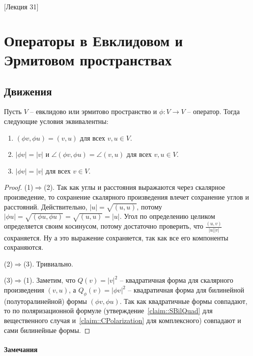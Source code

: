 [Лекция 31]


\newpage
\section{Операторы в Евклидовом и Эрмитовом пространствах}

\subsection{Движения}

\begin{claim}
Пусть $V$ -- евклидово или эрмитово пространство и $\phi\colon V\to V$ -- оператор.
Тогда следующие условия эквивалентны:
\begin{enumerate}
\item $(\phi v, \phi u) = (v, u)$ для всех $v, u\in V$.

\item $|\phi v| = |v|$ и $\angle(\phi v, \phi u) = \angle(v, u)$ для всех $v, u\in V$.

\item $|\phi v| = |v|$ для всех $v\in V$.
\end{enumerate}
\end{claim}
\begin{proof}
(1)$\Rightarrow$(2).
Так как углы и расстояния выражаются через скалярное произведение, то сохранение скалярного произведения влечет сохранение углов и расстояний.
Действительно, $|u| = \sqrt{(u,u)}$, потому $|\phi u| = \sqrt{(\phi u, \phi u)} = \sqrt{(u,u)}= |u|$.
Угол по определению целиком определяется своим косинусом, потому достаточно проверить, что $\frac{(u,v)}{|u| |v|}$ сохраняется.
Ну а это выражение сохраняется, так как все его компоненты сохраняются.


(2)$\Rightarrow$(3).
Тривиально.

(3)$\Rightarrow$(1).
Заметим, что $Q(v) = |v|^2$ -- квадратичная форма для скалярного произведения $(v,u)$, а $Q_\phi(v) = |\phi v|^2$ -- квадратичная форма для билинейной (полуторалинейной) формы $(\phi v, \phi u)$.
Так как квадратичные формы совпадают, то по поляризационной формуле (утверждение~\ref{claim::SBilQuad} для вещественного случая и~\ref{claim::CPolarization} для комплексного) совпадают и сами билинейные формы.
\end{proof}

\paragraph{Замечания}


